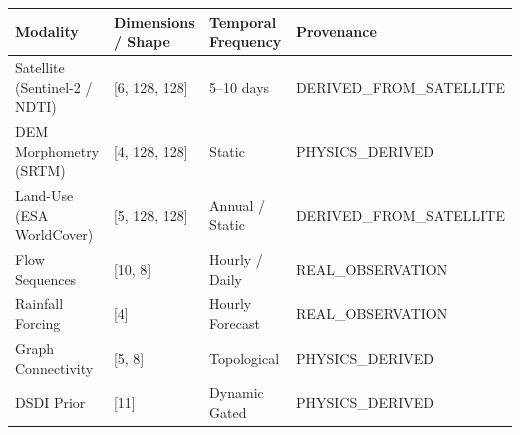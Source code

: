 \begin{tabular}{llll}
\toprule
Modality & Dimensions / Shape & Temporal Frequency & Provenance \\
\midrule
Satellite (Sentinel-2 / NDTI) & [6, 128, 128] & 5–10 days & DERIVED_FROM_SATELLITE \\
DEM Morphometry (SRTM) & [4, 128, 128] & Static & PHYSICS_DERIVED \\
Land-Use (ESA WorldCover) & [5, 128, 128] & Annual / Static & DERIVED_FROM_SATELLITE \\
Flow Sequences & [10, 8] & Hourly / Daily & REAL_OBSERVATION \\
Rainfall Forcing & [4] & Hourly Forecast & REAL_OBSERVATION \\
Graph Connectivity & [5, 8] & Topological & PHYSICS_DERIVED \\
DSDI Prior & [11] & Dynamic Gated & PHYSICS_DERIVED \\
\bottomrule
\end{tabular}
